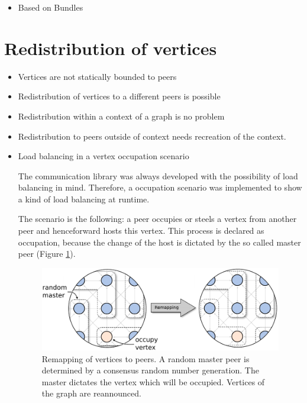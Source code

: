 \begin{itemize}
\item Based on Bundles
\end{itemize}

\section{Redistribution of vertices}
\begin{itemize}
\item Vertices are not statically bounded to peers
\item Redistribution of vertices to a different peers is possible
\item Redistribution within a context of a graph is no problem
\item Redistribution to peers outside of context needs recreation of
  the context.

\item Load balancing in a vertex occupation scenario

  The communication library was always developed with the possibility
  of load balancing in mind.  Therefore, a occupation scenario was
  implemented to show a kind of load balancing at runtime.

  The scenario is the following: a peer occupies or steels a vertex
  from another peer and henceforward hosts this vertex.  This process
  is declared as occupation, because the change of the host is
  dictated by the so called master peer (Figure
  \ref{fig:gol_remapping}).

  \begin{figure}[H]
    \centering
    \includegraphics[width=\textwidth]{graphics/40_gol_remapping}
    \caption{Remapping of vertices to peers. A random master peer is
      determined by a consensus random number generation. The master
      dictates the vertex which will be occupied. Vertices of the
      graph are reannounced.}
    \label{fig:gol_remapping}
  \end{figure}


\end{itemize}
